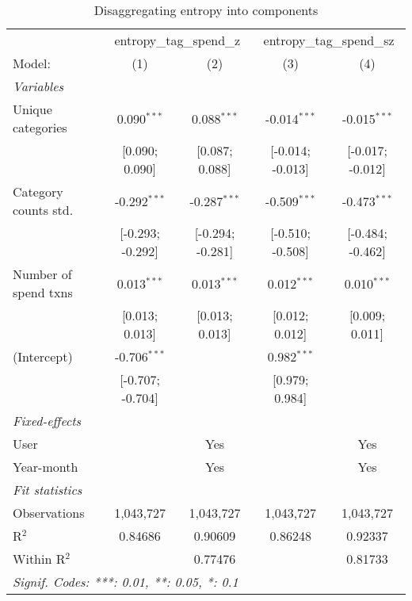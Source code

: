 
\begin{table}[htbp]
   \centering
   \tiny
   \begin{threeparttable}[b]
      \caption{\label{tab:reg_comp} Disaggregating entropy into components}
      \begin{tabular}{lcccc}
         \tabularnewline \midrule \midrule
          & \multicolumn{2}{c}{entropy\_tag\_spend\_z} & \multicolumn{2}{c}{entropy\_tag\_spend\_sz} \\ 
         Model:               & (1)              & (2)              & (3)              & (4)\\  
         \midrule
         \emph{Variables}\\
         Unique categories    & 0.090$^{***}$    & 0.088$^{***}$    & -0.014$^{***}$   & -0.015$^{***}$\\   
                              & [0.090; 0.090]   & [0.087; 0.088]   & [-0.014; -0.013] & [-0.017; -0.012]\\   
         Category counts std. & -0.292$^{***}$   & -0.287$^{***}$   & -0.509$^{***}$   & -0.473$^{***}$\\   
                              & [-0.293; -0.292] & [-0.294; -0.281] & [-0.510; -0.508] & [-0.484; -0.462]\\   
         Number of spend txns & 0.013$^{***}$    & 0.013$^{***}$    & 0.012$^{***}$    & 0.010$^{***}$\\   
                              & [0.013; 0.013]   & [0.013; 0.013]   & [0.012; 0.012]   & [0.009; 0.011]\\   
         (Intercept)          & -0.706$^{***}$   &                  & 0.982$^{***}$    &   \\   
                              & [-0.707; -0.704] &                  & [0.979; 0.984]   &   \\   
         \midrule
         \emph{Fixed-effects}\\
         User                 &                  & Yes              &                  & Yes\\  
         Year-month           &                  & Yes              &                  & Yes\\  
         \midrule
         \emph{Fit statistics}\\
         Observations         & 1,043,727        & 1,043,727        & 1,043,727        & 1,043,727\\  
         R$^2$                & 0.84686          & 0.90609          & 0.86248          & 0.92337\\  
         Within R$^2$         &                  & 0.77476          &                  & 0.81733\\  
         \midrule \midrule
         \multicolumn{5}{l}{\emph{Signif. Codes: ***: 0.01, **: 0.05, *: 0.1}}\\
      \end{tabular}
   \end{threeparttable}
\end{table}


